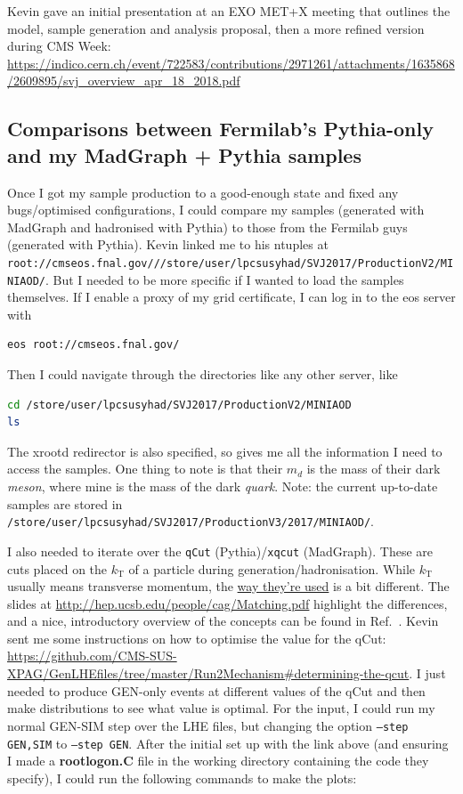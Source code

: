 Kevin gave an initial presentation at an EXO MET+X meeting that outlines the model, sample generation and analysis proposal, then a more refined version during CMS Week: \url{https://indico.cern.ch/event/722583/contributions/2971261/attachments/1635868/2609895/svj_overview_apr_18_2018.pdf}


\subsection{Comparisons between Fermilab's Pythia-only and my MadGraph + Pythia samples}

Once I got my sample production to a good-enough state and fixed any bugs/optimised configurations, I could compare my samples (generated with MadGraph and hadronised with Pythia) to those from the Fermilab guys (generated with Pythia). Kevin linked me to his ntuples at \texttt{root://cmseos.fnal.gov///store/user/lpcsusyhad/SVJ2017/ProductionV2/MINIAOD/}. But I needed to be more specific if I wanted to load the samples themselves. If I enable a proxy of my grid certificate, I can log in to the eos server with

\begin{lstlisting}[belowskip=-0.7cm, language=sh, numbers=none]
eos root://cmseos.fnal.gov/
\end{lstlisting}

Then I could navigate through the directories like any other server, like

\begin{lstlisting}[belowskip=-0.7cm, language=sh, numbers=none]
cd /store/user/lpcsusyhad/SVJ2017/ProductionV2/MINIAOD
ls
\end{lstlisting}

The xrootd redirector is also specified, so gives me all the information I need to access the samples. One thing to note is that their $m_d$ is the mass of their dark \emph{meson}, where mine is the mass of the dark \emph{quark}. Note: the current up-to-date samples are stored in \texttt{/store/user/lpcsusyhad/SVJ2017/ProductionV3/2017/MINIAOD/}.

I also needed to iterate over the \texttt{qCut} (Pythia)/\texttt{xqcut} (MadGraph). These are cuts placed on the $k_{\mathrm{T}}$ of a particle during generation/hadronisation. While $k_{\mathrm{T}}$ usually means transverse momentum, the \uline{way they're used} is a bit different. The slides at \url{http://hep.ucsb.edu/people/cag/Matching.pdf} highlight the differences, and a nice, introductory overview of the concepts can be found in Ref.~\cite{SalamJetClustering2006}. Kevin sent me some instructions on how to optimise the value for the qCut: \url{https://github.com/CMS-SUS-XPAG/GenLHEfiles/tree/master/Run2Mechanism#determining-the-qcut}. I just needed to produce GEN-only events at different values of the qCut and then make distributions to see what value is optimal. For the input, I could run my normal GEN-SIM step over the LHE files, but changing the option \texttt{--step GEN,SIM} to \texttt{--step GEN}. After the initial set up with the link above (and ensuring I made a \textbf{rootlogon.C} file in the working directory containing the code they specify), I could run the following commands to make the plots:

